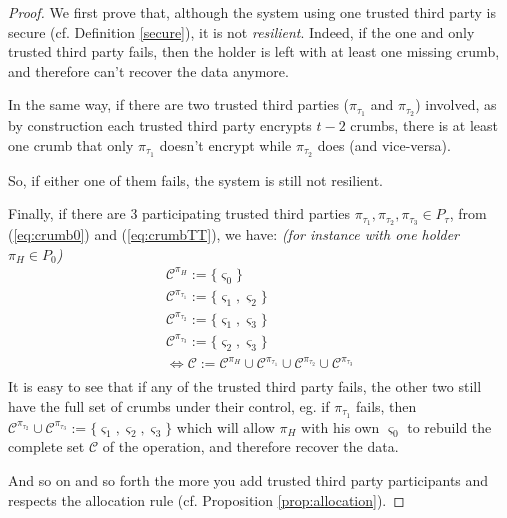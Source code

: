 \documentclass[twoside,twocolumn]{article}
\theoremstyle{definition}
\theoremstyle{remark}
\begin{document}
\begin{proof}
    We first prove that, although the system using one trusted third party is secure (cf. Definition \ref{secure}), it is not \emph{resilient}.
    Indeed, if the one and only trusted third party fails, then the holder is left with at least one missing crumb, and therefore can't recover the 
    data anymore.

    \vspace{1em} %

    In the same way, if there are two trusted third parties ($\pi_{\tau_1}$ and $\pi_{\tau_2}$) involved, as by construction each trusted third party 
    encrypts $t-2$ crumbs, there is at least one crumb that only $\pi_{\tau_1}$ doesn't encrypt while $\pi_{\tau_2}$ does (and vice-versa).
    
    So, if either one of them fails, the system is still not resilient.

    \vspace{1em} %

    Finally, if there are 3 participating trusted third parties $\pi_{\tau_1}, \pi_{\tau_2}, \pi_{\tau_3} \in P_\tau$, from (\ref{eq:crumb0}) and 
    (\ref{eq:crumbTT}), we have: \emph{(for instance with one holder $\pi_H \in P_0$)}$$
        \begin{array}{l}
            \mathcal{C}^{\pi_H} := \{ \varsigma_0 \} \\
            \mathcal{C}^{\pi_{\tau_1}} := \{ \varsigma_1, \varsigma_2 \} \\
            \mathcal{C}^{\pi_{\tau_2}} := \{ \varsigma_1, \varsigma_3 \} \\
            \mathcal{C}^{\pi_{\tau_3}} := \{ \varsigma_2, \varsigma_3 \} \\
            \iff \mathcal{C} := \mathcal{C}^{\pi_H} \cup \mathcal{C}^{\pi_{\tau_1}} \cup \mathcal{C}^{\pi_{\tau_2}} \cup \mathcal{C}^{\pi_{\tau_3}} \\
        \end{array}
    $$
    It is easy to see that if any of the trusted third party fails, the other two still have the full set of crumbs under their control, eg. if 
    $\pi_{\tau_1}$ fails, then $\mathcal{C}^{\pi_{\tau_2}} \cup \mathcal{C}^{\pi_{\tau_3}} := \{ \varsigma_1, \varsigma_2, \varsigma_3 \}$ which will 
    allow $\pi_H$ with his own $\varsigma_0$ to rebuild the complete set $\mathcal{C}$ of the operation, and therefore recover the data.

    And so on and so forth the more you add trusted third party participants and respects the allocation rule (cf. Proposition \ref{prop:allocation}).
\end{proof}
\end{document}
